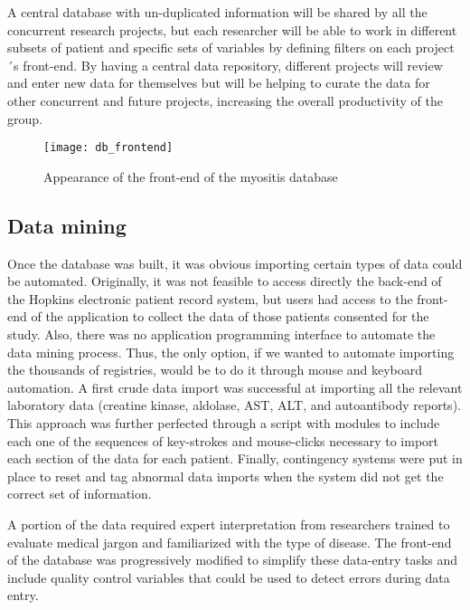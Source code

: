 A central database with un-duplicated information will be shared by all the concurrent research projects, but each researcher will be able to work in different subsets of patient and specific sets of variables by defining filters on each project´s front-end. By having a central data repository, different projects will review and enter new data for themselves but will be helping to curate the data for other concurrent and future projects, increasing the overall productivity of the group.

\begin{figure}
	\centering
	\texttt{[image: db\_frontend]}
	\caption{Appearance of the front-end of the myositis database}
	\label{fig:db_frontend}
\end{figure}

\subsection{Data mining}
Once the database was built, it was obvious importing certain types of data could be automated. Originally, it was not feasible to access directly the back-end of the Hopkins electronic patient record system, but users had access to the front-end of the application to collect the data of those patients consented for the study. Also, there was no application programming interface to automate the data mining process. Thus, the only option, if we wanted to automate importing the thousands of registries, would be to do it through mouse and keyboard automation. A first crude data import was successful at importing all the relevant laboratory data (creatine kinase, aldolase, AST, ALT, and autoantibody reports). This approach was further perfected through a script with modules to include each one of the sequences of key-strokes and mouse-clicks necessary to import each section of the data for each patient. Finally, contingency systems were put in place to reset and tag abnormal data imports when the system did not get the correct set of information.

A portion of the data required expert interpretation from researchers trained to evaluate medical jargon and familiarized with the type of disease. The front-end of the database was progressively modified to simplify these data-entry tasks and include quality control variables that could be used to detect errors during data entry.


